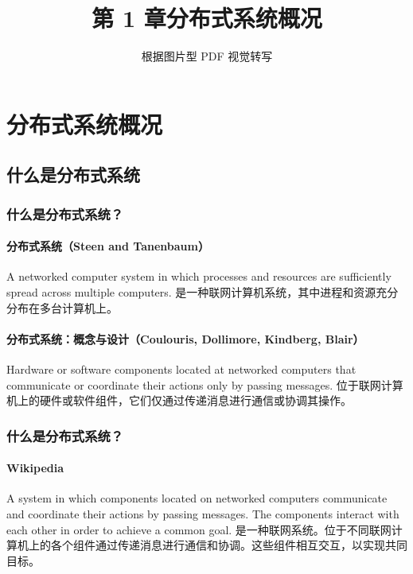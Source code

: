\documentclass[UTF8,a4paper,11pt]{ctexart}
\title{第 1 章\quad 分布式系统概况}
\author{根据图片型 PDF 视觉转写}
\date{}
\begin{document}
\maketitle
\tableofcontents
\newpage

\section{分布式系统概况}

\subsection{什么是分布式系统}

\subsubsection*{什么是分布式系统？}

\paragraph{分布式系统（Steen and Tanenbaum）}
A networked computer system in which processes and resources are sufficiently spread across multiple computers.
是一种联网计算机系统，其中进程和资源充分分布在多台计算机上。

\paragraph{分布式系统：概念与设计（Coulouris, Dollimore, Kindberg, Blair）}
Hardware or software components located at networked computers that communicate or coordinate their actions only by passing messages.
位于联网计算机上的硬件或软件组件，它们仅通过传递消息进行通信或协调其操作。

\subsubsection*{什么是分布式系统？}

\paragraph{Wikipedia}
A system in which components located on networked computers communicate and coordinate their actions by passing messages. The components interact with each other in order to achieve a common goal.
是一种联网系统。位于不同联网计算机上的各个组件通过传递消息进行通信和协调。这些组件相互交互，以实现共同目标。
\end{document}
